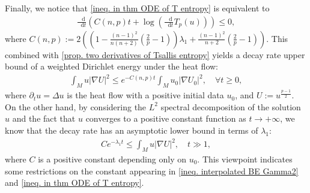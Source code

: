 \documentclass[11pt]{amsart}
\numberwithin{equation}{section}
\numberwithin{lemma}{section}
\numberwithin{proposition}{section}
\numberwithin{corollary}{section}
\numberwithin{remark}{section}
\newcommand{\dd}{\mathop{}\!\mathrm{d}}%
\begin{document}
Finally, we notice that \cref{ineq. in thm ODE of T entropy} is equivalent to
\begin{align*}
    \frac{\dd}{\dd t}\left(
    C(n,p)t+
    \log \left(
    \frac{\dd}{\dd t}T_p(u)
    \right)
    \right)\leq 0,
\end{align*}
where $C(n,p):=2\left(\left(
        1-\frac{(n-1)^2}{n(n+2)}\left(\frac{2}{p}-1\right)
        \right)\lambda_1
        +\frac{(n-1)^2}{n+2}\left(\frac{2}{p}-1\right)
        \right)$. This combined with \cref{prop. two derivatives of Tsallis entropy} yields a decay rate upper bound of a weighted Dirichlet energy under the heat flow:
        \begin{align*}
            \int_M u|\nabla U|^2\leq e^{-C(n,p)t}\int_M u_0|\nabla U_0|^2,\quad \forall t\geq 0,
        \end{align*}
        where $\partial_tu=\Delta u$ is the heat flow with a positive initial data $u_0$, and $U:=u^{\frac{p-1}{2}}$.
        On the other hand, by considering the $L^2$ spectral decomposition of the solution $u$ and the fact that $u$ converges to a positive constant function as $t\to+\infty$, we know that  the decay rate has an asymptotic  lower bound in terms of $\lambda_1$: 
        \begin{align*}
            Ce^{-\lambda_1t}\leq\int_M u|\nabla U|^2,\quad t\gg 1,
        \end{align*}
        where $C$ is a positive constant depending only on $u_0$.
        This viewpoint indicates some restrictions on the constant appearing in  \cref{ineq. interpolated BE Gamma2} and 
        \cref{ineq. in thm ODE of T entropy}.
        





\end{document}
